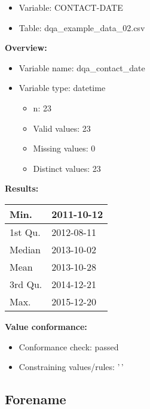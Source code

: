 \documentclass[
]{article}
\providecommand{\tightlist}{%
  \setlength{\itemsep}{0pt}\setlength{\parskip}{0pt}}
\begin{document}
\begin{itemize}
\tightlist
\item
  Variable: CONTACT-DATE
\item
  Table: dqa\_example\_data\_02.csv
\end{itemize}

\textbf{Overview:}

\begin{itemize}
\tightlist
\item
  Variable name: dqa\_contact\_date
\item
  Variable type: datetime

  \begin{itemize}
  \tightlist
  \item
    n: 23
  \item
    Valid values: 23
  \item
    Missing values: 0
  \item
    Distinct values: 23
  \end{itemize}
\end{itemize}

\textbf{Results:}\\

\begin{table}[H]
\centering
\begin{tabular}{l|l}
\hline
Min. & 2011-10-12\\
\hline
1st Qu. & 2012-08-11\\
\hline
Median & 2013-10-02\\
\hline
Mean & 2013-10-28\\
\hline
3rd Qu. & 2014-12-21\\
\hline
Max. & 2015-12-20\\
\hline
\end{tabular}
\end{table}

\textbf{Value conformance:}

\begin{itemize}
\tightlist
\item
  Conformance check: passed
\item
  Constraining values/rules: '\,'
\end{itemize}

\newpage

\hypertarget{forename}{%
\subsection{Forename}\label{forename}}
\end{document}
